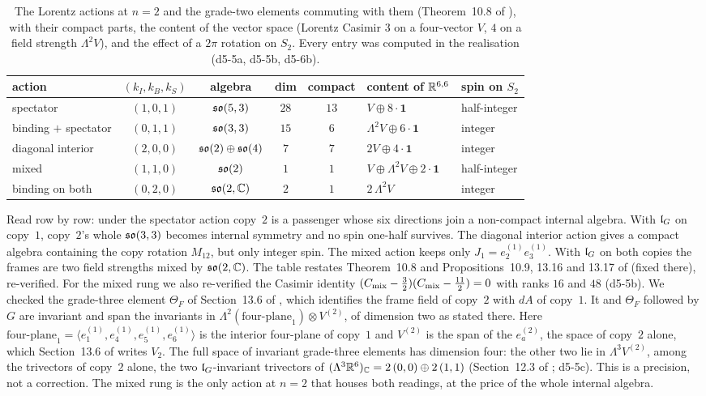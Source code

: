 \begin{table}[t]
\centering
\small
\begin{tabular}{@{}lccccll@{}}
\toprule
action & $(k_I,k_B,k_S)$ & algebra & dim & compact & content of $\mathbb{R}^{6,6}$ & spin on $S_2$\\
\midrule
spectator & $(1,0,1)$ & $\mathfrak{so}(5,3)$ & $28$ & $13$ & $V\oplus8\cdot\mathbf1$ & half-integer\\
binding $+$ spectator & $(0,1,1)$ & $\mathfrak{so}(3,3)$ & $15$ & $6$ & $\Lambda^2V\oplus6\cdot\mathbf1$ & integer\\
diagonal interior & $(2,0,0)$ & $\mathfrak{so}(2)\oplus\mathfrak{so}(4)$ & $7$ & $7$ & $2V\oplus4\cdot\mathbf1$ & integer\\
mixed & $(1,1,0)$ & $\mathfrak{so}(2)$ & $1$ & $1$ & $V\oplus\Lambda^2V\oplus2\cdot\mathbf1$ & half-integer\\
binding on both & $(0,2,0)$ & $\mathfrak{so}(2,\mathbb{C})$ & $2$ & $1$ & $2\,\Lambda^2V$ & integer\\
\bottomrule
\end{tabular}
\caption{The Lorentz actions at $n=2$ and the grade-two elements commuting with them (Theorem~10.8 of \cite{ES17}), with their compact parts,
the content of the vector space (Lorentz Casimir $3$ on a four-vector $V$, $4$ on a field strength $\Lambda^2V$), and the effect of a $2\pi$
rotation on $S_2$. Every entry was computed in the realisation (d5-5a, d5-5b, d5-6b).}
\label{d5:tab:actions}
\end{table}

Read row by row: under the spectator action copy~$2$ is a passenger whose six directions join a non-compact internal algebra. With
$\mathfrak l_G$ on copy~$1$, copy~$2$'s whole $\mathfrak{so}(3,3)$ becomes internal symmetry and no spin one-half survives. The diagonal interior action gives a
compact algebra containing the copy rotation $M_{12}$, but only integer spin. The mixed action keeps only $J_1=e^{(1)}_2e^{(1)}_3$. With $\mathfrak l_G$ on both
copies the frames are two field strengths mixed by $\mathfrak{so}(2,\mathbb{C})$. The table restates Theorem~10.8 and Propositions~10.9, 13.16 and 13.17 of
\cite{ES17} (fixed there), re-verified. For the mixed rung we also re-verified the Casimir identity
$(C_{\rm mix}-\tfrac32)(C_{\rm mix}-\tfrac{11}2)=0$ with ranks $16$ and $48$ (d5-5b). We checked the grade-three element $\Theta_F$ of Section~13.6 of
\cite{ES17}, which identifies the frame field of copy~$2$ with $dA$ of copy~$1$. It and $\Theta_F$ followed by $G$ are invariant and span the
invariants in $\Lambda^2(\text{four-plane}_1)\otimes V^{(2)}$, of dimension two as stated there. Here $\text{four-plane}_1=\langle e^{(1)}_1,e^{(1)}_4,e^{(1)}_5,e^{(1)}_6\rangle$ is the interior four-plane of copy~$1$ and $V^{(2)}$ is the span of the $e^{(2)}_a$, the space of copy~$2$ alone, which Section~13.6 of \cite{ES17} writes $V_2$. The full space of invariant grade-three elements has
dimension four: the other two lie in $\Lambda^3V^{(2)}$, among the trivectors of copy~$2$ alone, the two $\mathfrak l_G$-invariant trivectors of
$(\Lambda^3\mathbb{R}^6)_{\mathbb{C}}=2\,(0,0)\oplus2\,(1,1)$ (Section~12.3 of \cite{ES17}; d5-5c). This is a precision, not a correction. The mixed rung is the only
action at $n=2$ that houses both readings, at the price of the whole internal algebra.

